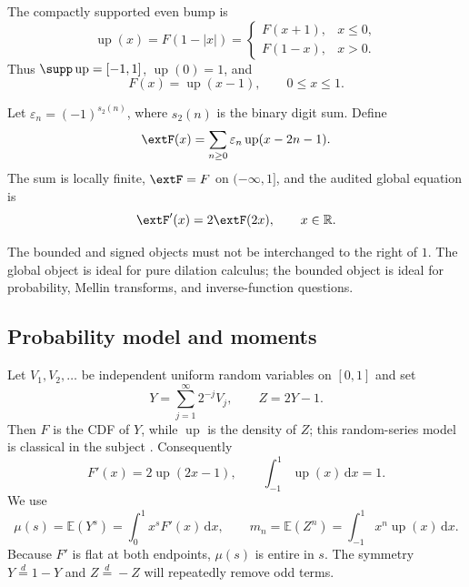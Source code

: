 \documentclass[11pt,oneside]{article}
\theoremstyle{definition}
\theoremstyle{remark}
\newcommand{\Up}{\operatorname{up}}
\newcommand{\E}{\mathbb E}
\newcommand{\R}{\mathbb R}
\newcommand{\dd}{\,\mathrm d}
\newcommand{\1}{\mathbf 1}
\begin{document}
\begin{definition}
The compactly supported even bump is
\begin{equation}
 \Up(x)=F(1-|x|)=
 \begin{cases}
  F(x+1),&x\le0,\\
  F(1-x),&x>0.
 \end{cases}
 \label{p7:eq:up-fold}
\end{equation}
Thus $\supp\Up=[-1,1]$, $\Up(0)=1$, and
\begin{equation}
 F(x)=\Up(x-1),\qquad 0\le x\le1.
 \label{p7:eq:F-up-translate}
\end{equation}
\end{definition}

\begin{definition}
Let $\varepsilon_n=(-1)^{s_2(n)}$, where $s_2(n)$ is the binary digit sum.  Define
\begin{equation}
 \extF(x)=\sum_{n\ge0}\varepsilon_n\Up(x-2n-1).
 \label{p7:eq:global-F}
\end{equation}
The sum is locally finite, $\extF=F$ on $(-\infty,1]$, and the audited global equation is
\begin{equation}
 \extF'(x)=2\extF(2x),\qquad x\in\R.
 \label{p7:eq:global-dilation}
\end{equation}
\end{definition}

The bounded and signed objects must not be interchanged to the right of $1$.  The global
object is ideal for pure dilation calculus; the bounded object is ideal for probability,
Mellin transforms, and inverse-function questions.

\subsection{Probability model and moments}

Let $V_1,V_2,\ldots$ be independent uniform random variables on $[0,1]$ and set
\begin{equation}
 Y=\sum_{j=1}^{\infty}2^{-j}V_j,
 \qquad
 Z=2Y-1.
 \label{p7:eq:Y-Z}
\end{equation}
Then $F$ is the CDF of $Y$, while $\Up$ is the density of $Z$; this random-series model
is classical in the subject \cite{p7:arias1982,p7:arias2018,p7:project-frontier}.  Consequently
\begin{equation}
 F'(x)=2\Up(2x-1),
 \qquad
 \int_{-1}^{1}\Up(x)\dd x=1.
 \label{p7:eq:Fprime-up}
\end{equation}
We use
\begin{equation}
 \mu(s)=\E(Y^s)=\int_0^1x^sF'(x)\dd x,
 \qquad
 m_n=\E(Z^n)=\int_{-1}^{1}x^n\Up(x)\dd x.
 \label{p7:eq:moments}
\end{equation}
Because $F'$ is flat at both endpoints, $\mu(s)$ is entire in $s$.  The symmetry
$Y\overset d=1-Y$ and $Z\overset d=-Z$ will repeatedly remove odd terms.
\end{document}
